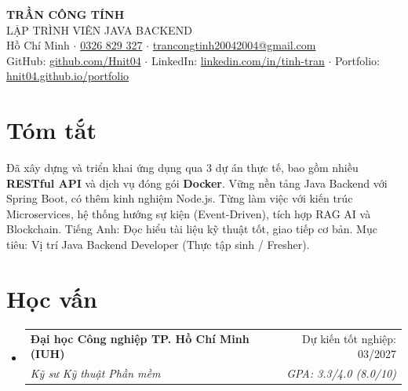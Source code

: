 \documentclass[letterpaper,11pt]{article}
\makeatletter
\newcommand{\resumeSubheading}[4]{
  \vspace{-2pt}\item
    \begin{tabular*}{0.97\textwidth}[t]{l@{\extracolsep{\fill}}r}
      \textbf{#1} & #2 \\
      \textit{\small#3} & \textit{\small #4} \\
    \end{tabular*}\vspace{-7pt}
}
\newcommand{\resumeSubHeadingListStart}{\begin{itemize}[leftmargin=0.15in, label={}]}
\newcommand{\resumeSubHeadingListEnd}{\end{itemize}}
\makeatother
\begin{document}
\begin{center}
    {\fontsize{24pt}{28pt}\selectfont\textbf{TRẦN CÔNG TÍNH}} \\ \vspace{4pt}
    {\fontsize{12pt}{14pt}\selectfont LẬP TRÌNH VIÊN JAVA BACKEND} \\ \vspace{4pt}
    \small
    Hồ Chí Minh \enspace$\cdot$\enspace
    \href{tel:+84326829327}{0326 829 327} \enspace$\cdot$\enspace
    \href{mailto:trancongtinh20042004@gmail.com}{trancongtinh20042004@gmail.com} \\[2pt]
    GitHub: \href{https://github.com/Hnit04}{github.com/Hnit04} \enspace$\cdot$\enspace
    LinkedIn: \href{https://linkedin.com/in/tinh-tran-484444408}{linkedin.com/in/tinh-tran} \enspace$\cdot$\enspace
    Portfolio: \href{https://hnit04.github.io/portfolio}{hnit04.github.io/portfolio}
\end{center}

\section{Tóm tắt}
  \small{
    Đã xây dựng và triển khai ứng dụng qua 3 dự án thực tế, bao gồm nhiều \textbf{RESTful API} và dịch vụ đóng gói \textbf{Docker}. Vững nền tảng Java Backend với Spring Boot, có thêm kinh nghiệm Node.js. Từng làm việc với kiến trúc Microservices, hệ thống hướng sự kiện (Event-Driven), tích hợp RAG AI và Blockchain. Tiếng Anh: Đọc hiểu tài liệu kỹ thuật tốt, giao tiếp cơ bản. Mục tiêu: Vị trí Java Backend Developer (Thực tập sinh / Fresher).
  }

\section{Học vấn}
  \resumeSubHeadingListStart
    \resumeSubheading
      {Đại học Công nghiệp TP. Hồ Chí Minh (IUH)}{Dự kiến tốt nghiệp: 03/2027}
      {Kỹ sư Kỹ thuật Phần mềm}{GPA: 3.3/4.0 (8.0/10)}
  \resumeSubHeadingListEnd

\end{document}
